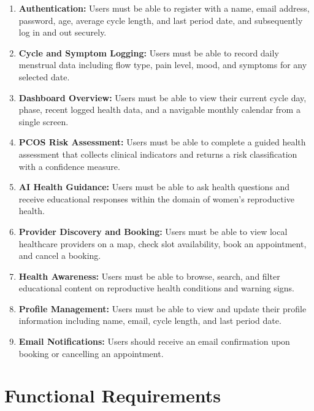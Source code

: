 \begin{enumerate}
    \item \textbf{Authentication:} Users must be able to register with a name, email address, password, age, average cycle length, and last period date, and subsequently log in and out securely.

    \item \textbf{Cycle and Symptom Logging:} Users must be able to record daily menstrual data including flow type, pain level, mood, and symptoms for any selected date.

    \item \textbf{Dashboard Overview:} Users must be able to view their current cycle day, phase, recent logged health data, and a navigable monthly calendar from a single screen.

    \item \textbf{PCOS Risk Assessment:} Users must be able to complete a guided health assessment that collects clinical indicators and returns a risk classification with a confidence measure.

    \item \textbf{AI Health Guidance:} Users must be able to ask health questions and receive educational responses within the domain of women's reproductive health.

    \item \textbf{Provider Discovery and Booking:} Users must be able to view local healthcare providers on a map, check slot availability, book an appointment, and cancel a booking.

    \item \textbf{Health Awareness:} Users must be able to browse, search, and filter educational content on reproductive health conditions and warning signs.

    \item \textbf{Profile Management:} Users must be able to view and update their profile information including name, email, cycle length, and last period date.

    \item \textbf{Email Notifications:} Users should receive an email confirmation upon booking or cancelling an appointment.
\end{enumerate}

\section{Functional Requirements}
\label{sec:functional}

